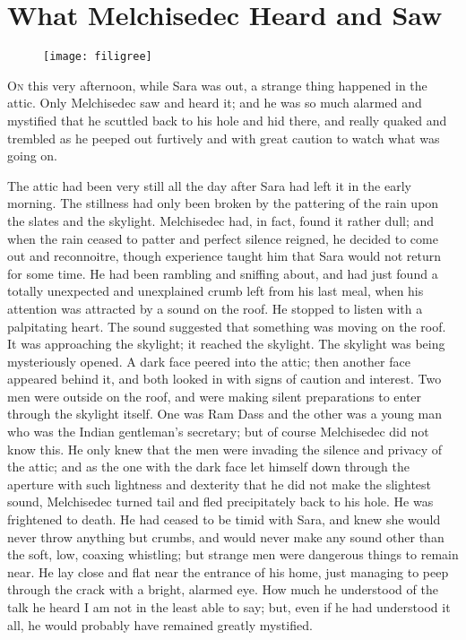 \chapter{What Melchisedec Heard and Saw}

\begin{figure}[t!]
\centering
\texttt{[image: filigree]}
\end{figure}

\lettrine[lines=5]{O}{n} this very afternoon, while Sara was out, a strange thing happened in the attic. Only Melchisedec saw and heard it; and he was so much alarmed and mystified that he scuttled back to his hole and hid there, and really quaked and trembled as he peeped out furtively and with great caution to watch what was going on.

The attic had been very still all the day after Sara had left it in the early morning. The stillness had only been broken by the pattering of the rain upon the slates and the skylight. Melchisedec had, in fact, found it rather dull; and when the rain ceased to patter and perfect silence reigned, he decided to come out and reconnoitre, though experience taught him that Sara would not return for some time. He had been rambling and sniffing about, and had just found a totally unexpected and unexplained crumb left from his last meal, when his attention was attracted by a sound on the roof. He stopped to listen with a palpitating heart. The sound suggested that something was moving on the roof. It was approaching the skylight; it reached the skylight. The skylight was being mysteriously opened. A dark face peered into the attic; then another face appeared behind it, and both looked in with signs of caution and interest. Two men were outside on the roof, and were making silent preparations to enter through the skylight itself. One was Ram Dass and the other was a young man who was the Indian gentleman's secretary; but of course Melchisedec did not know this. He only knew that the men were invading the silence and privacy of the attic; and as the one with the dark face let himself down through the aperture with such lightness and dexterity that he did not make the slightest sound, Melchisedec turned tail and fled precipitately back to his hole. He was frightened to death. He had ceased to be timid with Sara, and knew she would never throw anything but crumbs, and would never make any sound other than the soft, low, coaxing whistling; but strange men were dangerous things to remain near. He lay close and flat near the entrance of his home, just managing to peep through the crack with a bright, alarmed eye. How much he understood of the talk he heard I am not in the least able to say; but, even if he had understood it all, he would probably have remained greatly mystified.

